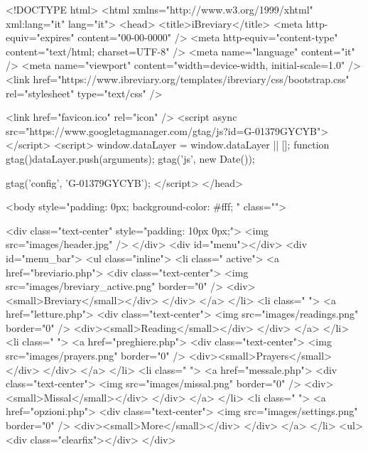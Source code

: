 	<!DOCTYPE html>
	<html xmlns="http://www.w3.org/1999/xhtml" xml:lang="it" lang="it">
	<head>
	<title>iBreviary</title>
	<meta http-equiv="expires" content="00-00-0000" />
	<meta http-equiv="content-type" content="text/html; charset=UTF-8" />
	<meta name="language" content="it" />
	<meta name="viewport" content="width=device-width, initial-scale=1.0" />
	<link href="https://www.ibreviary.org/templates/ibreviary/css/bootstrap.css" rel="stylesheet" type="text/css" />
	
	<link href="favicon.ico" rel="icon" />
    <script async src="https://www.googletagmanager.com/gtag/js?id=G-01379GYCYB"></script>
    <script>
      window.dataLayer = window.dataLayer || [];
      function gtag(){dataLayer.push(arguments);}
      gtag('js', new Date());
    
      gtag('config', 'G-01379GYCYB');
    </script>
	</head>

	<body style="padding: 0px; background-color: #fff; " class="">

     <div class="text-center" style="padding: 10px 0px;">
    <img src="images/header.jpg" />
	</div>
    <div id="menu"></div>
	<div id="menu_bar">
	<ul class="inline">
        <li class=" active">
            <a href="breviario.php">
                <div class="text-center">
                    <img src="images/breviary_active.png" border="0" />
                    <div><small>Breviary</small></div>
               </div>
            </a>
        </li>
        <li class=" ">
            <a href="letture.php">
                <div class="text-center">
                    <img src="images/readings.png" border="0" />
                    <div><small>Reading</small></div>
               </div>
            </a>
        </li>
        <li class=" ">
            <a href="preghiere.php">
                <div class="text-center">
                    <img src="images/prayers.png" border="0" />
                    <div><small>Prayers</small></div>
               </div>
            </a>
        </li>
        <li class=" ">
            <a href="messale.php">
                <div class="text-center">
                    <img src="images/missal.png" border="0" />
                    <div><small>Missal</small></div>
               </div>
            </a>
        </li>
        <li class=" ">
            <a href="opzioni.php">
                <div class="text-center">
                    <img src="images/settings.png" border="0" />
                    <div><small>More</small></div>
               </div>
            </a>
        </li>
    <ul>
    <div class="clearfix"></div>
	</div>

